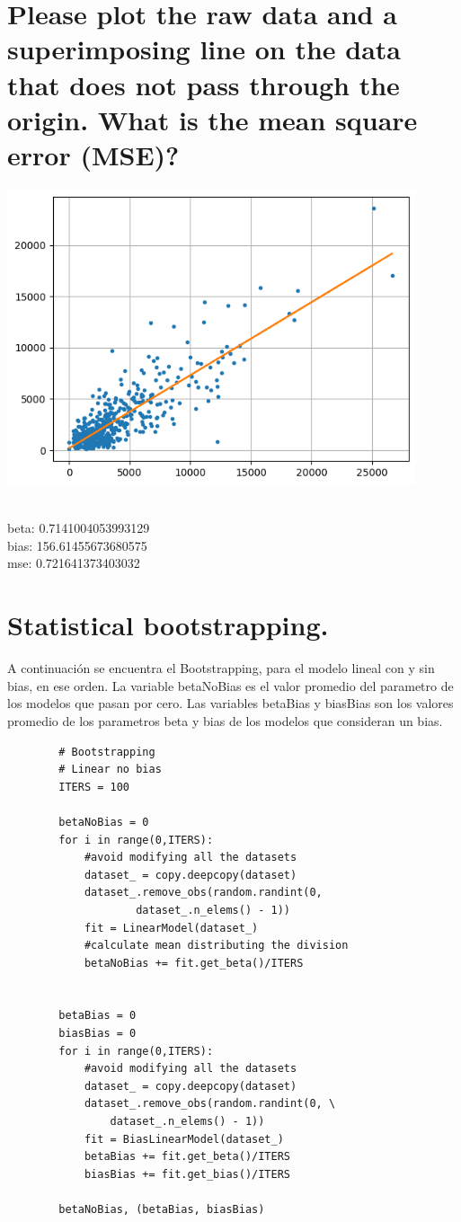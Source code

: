 \documentclass{report}
\begin{document}
        \section{Please plot the raw data and a superimposing line on the data that does not pass through the origin. What is the mean square error (MSE)?}
            {\includegraphics[width=0.9\textwidth]{latex/question10.png}\par} \\
            beta: 0.7141004053993129 \\
            bias: 156.61455673680575 \\
            mse: 0.721641373403032

        \section{ Statistical bootstrapping.}

        A continuaci\'on se encuentra el Bootstrapping, para el modelo lineal con y sin bias, en ese orden. La variable betaNoBias es el valor promedio del parametro de los modelos que pasan por cero. Las variables betaBias y biasBias son los valores promedio de los parametros beta y bias de los modelos que consideran un bias.

        \begin{lstlisting}
        # Bootstrapping
        # Linear no bias
        ITERS = 100

        betaNoBias = 0
        for i in range(0,ITERS):
            #avoid modifying all the datasets
            dataset_ = copy.deepcopy(dataset)
            dataset_.remove_obs(random.randint(0,
                    dataset_.n_elems() - 1))
            fit = LinearModel(dataset_)
            #calculate mean distributing the division
            betaNoBias += fit.get_beta()/ITERS


        betaBias = 0
        biasBias = 0
        for i in range(0,ITERS):
            #avoid modifying all the datasets
            dataset_ = copy.deepcopy(dataset)
            dataset_.remove_obs(random.randint(0, \
                dataset_.n_elems() - 1))
            fit = BiasLinearModel(dataset_)
            betaBias += fit.get_beta()/ITERS
            biasBias += fit.get_bias()/ITERS

        betaNoBias, (betaBias, biasBias)
        \end{lstlisting}
\end{document}
